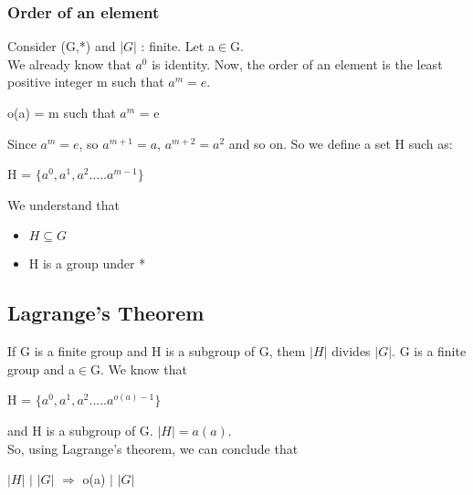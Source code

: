 \documentclass[11pt]{article}
\begin{document}
\subsubsection{Order of an element}
Consider (G,*) and $|G|$ : finite. Let a$\in$G.\\
We already know that $a^0$ is identity. Now, the order of an element is the least positive integer m such that $a^m = e$. 
\begin{center}
    o(a) = m such that $a^m$ = e
\end{center}
Since $a^m = e$, so $a^{m+1}=a$, $a^{m+2}=a^2$ and so on. So we define a set H such as:
\begin{center}
    H = $\{a^0, a^1, a^2.....a^{m-1}\}$
\end{center}
We understand that
\begin{itemize}
    \item $H \subseteq G$
    \item H is a group under *
\end{itemize}
\subsection{Lagrange's Theorem}
If G is a finite group and H is a subgroup of G, them $|H|$ divides $|G|$.
\vspace{3mm}
G is a finite group and a$\in$G. We know that 
\begin{center}
    H = $\{a^0, a^1, a^2.....a^{o(a)-1}\}$
\end{center}
and H is a subgroup of G. $|H|=a(a)$.
\\So, using Lagrange's theorem, we can conclude that
\begin{center}
    $|H|$ $|$ $|G|$ $\Rightarrow$ o(a) $|$ $|G|$
\end{center}
\end{document}
